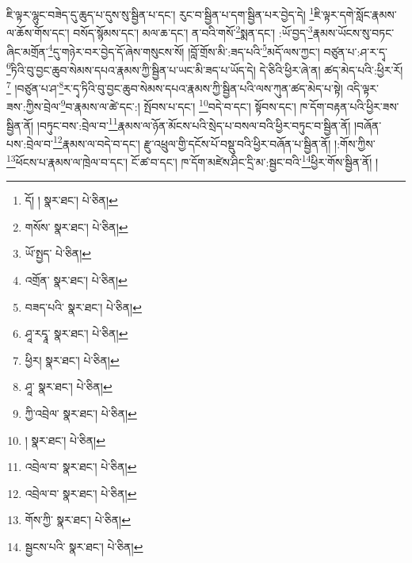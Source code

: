 ཇི་ལྟར་ལྷུང་བཟེད་དུ་ཆུད་པ་དུས་སུ་སྦྱིན་པ་དང་། རུང་བ་སྦྱིན་པ་དག་སྦྱིན་པར་བྱེད་དེ། \footnote{དོ། །   སྣར་ཐང་།  པེ་ཅིན། }ཇི་ལྟར་དགེ་སློང་རྣམས་ལ་ཆོས་གོས་དང་། བསོད་སྙོམས་དང་། མལ་ཆ་དང་། ན་བའི་གསོ་\footnote{གསོས་  སྣར་ཐང་།  པེ་ཅིན། }སྨན་དང་། :ཡོ་བྱད་\footnote{ཡོ་སྤྱད་  པེ་ཅིན། }རྣམས་ཡོངས་སུ་བཏང་ཞིང་མགྲོན་\footnote{འགྲོན་  སྣར་ཐང་།  པེ་ཅིན། }དུ་གཉེར་བར་བྱེད་དོ་ཞེས་གསུངས་སོ། །བློ་གྲོས་མི་:ཟད་པའི་\footnote{བཟད་པའི་  སྣར་ཐང་།  པེ་ཅིན། }མདོ་ལས་ཀྱང་། བཙུན་པ་:ཤ་ར་དྭ་\footnote{ཤཱ་རདྭཱ་  སྣར་ཐང་།  པེ་ཅིན། }ཏིའི་བུ་བྱང་ཆུབ་སེམས་དཔའ་རྣམས་ཀྱི་སྦྱིན་པ་ཡང་མི་ཟད་པ་ཡོད་དེ། དེ་ཅིའི་ཕྱིར་ཞེ་ན། ཚད་མེད་པའི་:ཕྱིར་རོ།\footnote{ཕྱིར།  སྣར་ཐང་།  པེ་ཅིན། } །བཙུན་པ་ཤ་\footnote{ཤཱ་  སྣར་ཐང་།  པེ་ཅིན། }ར་དྭ་ཏིའི་བུ་བྱང་ཆུབ་སེམས་དཔའ་རྣམས་ཀྱི་སྦྱིན་པའི་ལས་ཀུན་ཚད་མེད་པ་སྟེ། འདི་ལྟར་ཟས་:ཀྱིས་བྲེལ་\footnote{ཀྱི་འབྲེལ་  སྣར་ཐང་།  པེ་ཅིན། }བ་རྣམས་ལ་ཚེ་དང་:། སྤོབས་པ་དང་། \footnote{།    སྣར་ཐང་།  པེ་ཅིན། }བདེ་བ་དང་། སྟོབས་དང་། ཁ་དོག་བརྟན་པའི་ཕྱིར་ཟས་སྦྱིན་ནོ། །བཏུང་བས་:བྲེལ་བ་\footnote{འབྲེལ་བ་  སྣར་ཐང་།  པེ་ཅིན། }རྣམས་ལ་ཉོན་མོངས་པའི་སྲེད་པ་བསལ་བའི་ཕྱིར་བཏུང་བ་སྦྱིན་ནོ། །བཞོན་པས་:བྲེལ་བ་\footnote{འབྲེལ་བ་  སྣར་ཐང་།  པེ་ཅིན། }རྣམས་ལ་བདེ་བ་དང་། རྫུ་འཕྲུལ་གྱི་དངོས་པོ་བསྡུ་བའི་ཕྱིར་བཞོན་པ་སྦྱིན་ནོ། །:གོས་ཀྱིས་\footnote{གོས་ཀྱི་  སྣར་ཐང་།  པེ་ཅིན། }ཕོངས་པ་རྣམས་ལ་ཁྲེལ་བ་དང་། ངོ་ཚ་བ་དང་། ཁ་དོག་མཛེས་ཤིང་དྲི་མ་:སྦྱང་བའི་\footnote{སྦྱངས་པའི་  སྣར་ཐང་།  པེ་ཅིན། }ཕྱིར་གོས་སྦྱིན་ནོ། །
